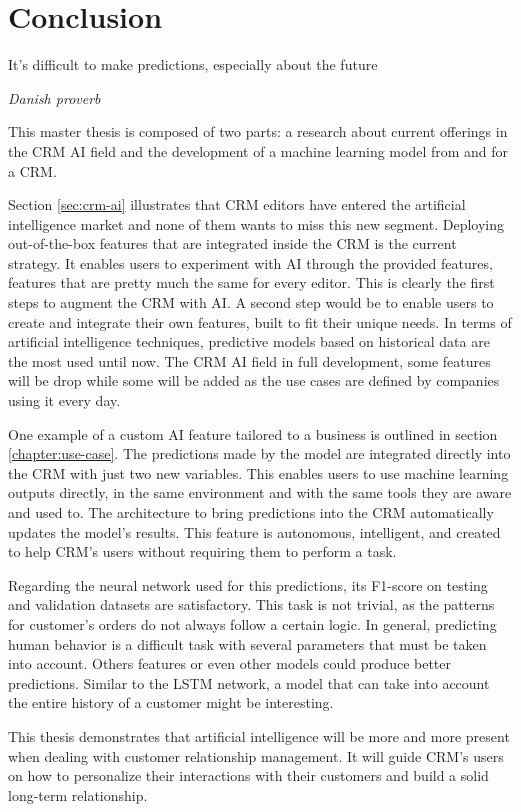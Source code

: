 \chapter{Conclusion}

\vspace{-0.5cm}
\epigraph{It’s difficult to make predictions, especially about the future}{\textit{Danish proverb}}
\vspace{0.5cm}

This master thesis is composed of two parts: a research about current offerings in the CRM AI field and the development of a machine learning model from and for a CRM.

Section \ref{sec:crm-ai} illustrates that CRM editors have entered the artificial intelligence market and none of them wants to miss this new segment. Deploying out-of-the-box features that are integrated inside the CRM is the current strategy. It enables users to experiment with AI through the provided features, features that are pretty much the same for every editor. This is clearly the first steps to augment the CRM with AI. A second step would be to enable users to create and integrate their own features, built to fit their unique needs. In terms of artificial intelligence techniques, predictive models based on historical data are the most used until now. The CRM AI field in full development, some features will be drop while some will be added as the use cases are defined by companies using it every day.

One example of a custom AI feature tailored to a business is outlined in section \ref{chapter:use-case}. The predictions made by the model are integrated directly into the CRM with just two new variables. This enables users to use machine learning outputs directly, in the same environment and with the same tools they are aware and used to. The architecture to bring predictions into the CRM automatically updates the model's results. This feature is autonomous, intelligent, and created to help CRM's users without requiring them to perform a task.

Regarding the neural network used for this predictions, its F1-score on testing and validation datasets are satisfactory. This task is not trivial, as the patterns for customer's orders do not always follow a certain logic. In general, predicting human behavior is a difficult task with several parameters that must be taken into account. Others features or even other models could produce better predictions. Similar to the LSTM network, a model that can take into account the entire history of a customer might be interesting.

This thesis demonstrates that artificial intelligence will be more and more present when dealing with customer relationship management. It will guide CRM's users on how to personalize their interactions with their customers and build a solid long-term relationship.